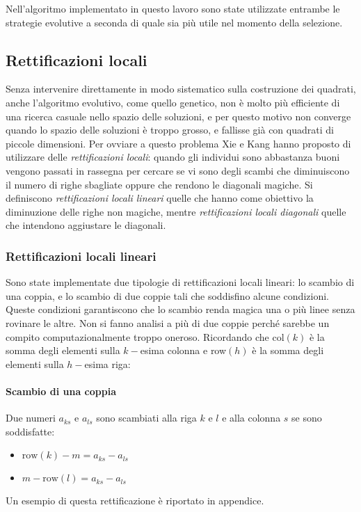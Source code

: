 \documentclass[italian,twoside,twocolumn]{article}
\begin{document}
Nell'algoritmo implementato in questo lavoro sono state utilizzate entrambe le strategie evolutive a seconda di quale sia più utile nel momento della selezione. 

\subsection{Rettificazioni locali}

Senza intervenire direttamente in modo sistematico sulla costruzione dei quadrati, anche l'algoritmo evolutivo, come quello genetico, non è molto più efficiente di una ricerca casuale nello spazio delle soluzioni, e per questo motivo non converge quando lo spazio delle soluzioni è troppo grosso, e fallisse già con quadrati di piccole dimensioni. Per ovviare a questo problema Xie e Kang hanno proposto di utilizzare delle \emph{rettificazioni locali}: quando gli individui sono abbastanza buoni vengono passati in rassegna per cercare se vi sono degli scambi che diminuiscono il numero di righe sbagliate oppure che rendono le diagonali magiche. Si definiscono \emph{rettificazioni locali lineari} quelle che hanno come obiettivo la diminuzione delle righe non magiche, mentre \emph{rettificazioni locali diagonali} quelle che intendono aggiustare le diagonali.

\subsubsection{Rettificazioni locali lineari}
Sono state implementate due tipologie di rettificazioni locali lineari: lo scambio di una coppia, e lo scambio di due coppie tali che soddisfino alcune condizioni. Queste condizioni garantiscono che lo scambio renda magica una o più linee senza rovinare le altre. Non si fanno analisi a più di due coppie perché sarebbe un compito computazionalmente troppo oneroso. Ricordando che col$ (k) $ è la somma degli elementi sulla $ k- $esima colonna e row$ (h) $ è la somma degli elementi sulla $ h- $esima riga:

\paragraph{Scambio di una coppia} Due numeri $ a_{ks} $ e $ a_{ls} $ sono scambiati alla riga $ k $ e $ l $ e alla colonna $ s $ se sono soddisfatte: 
\begin{itemize}
	\item $ \text{row}(k) - \mathit{m} = a_{ks} - a_{ls} $
	\item $ \mathit{m} - \text{row}(l) = a_{ks} - a_{ls} $
\end{itemize}
Un esempio di questa rettificazione è riportato in appendice. 
\end{document}
